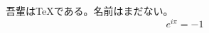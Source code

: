 \documentclass[12pt]{ltjsarticle}
\begin{document}
吾輩は\TeX である。名前はまだない。
\[e^{i\pi}=-1\]
\end{document}
